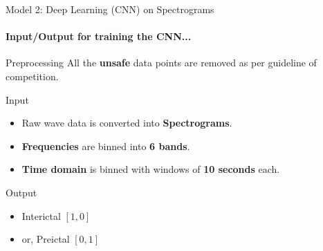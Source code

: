 \documentclass{beamer}
\begin{document}
\begin{frame}{Model 2: Deep Learning (CNN) on Spectrograms}
  \framesubtitle{Input/Output for training the CNN...}

  \begin{block}{Preprocessing}
    All the \textbf{unsafe} data points are removed as per guideline of
    competition.
  \end{block}
  
  \begin{block}{Input}
    \begin{itemize}
    \item Raw wave data is converted into \textbf{Spectrograms}.
    \item \textbf{Frequencies} are binned into \textbf{6 bands}.
    \item \textbf{Time domain} is binned with windows of \textbf{10 seconds} each.
    \end{itemize}
  \end{block}  

  \begin{block}{Output}
    \begin{itemize}
      \item Interictal $[1, 0]$
      \item or, Preictal   $[0, 1]$
    \end{itemize}
  \end{block}  

\end{frame}
\end{document}

